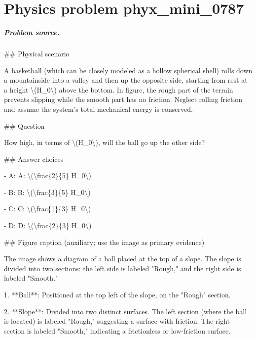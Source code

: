 
\chapter{Physics problem phyx\_mini\_0787}
\label{ch:PhyXMiniProblems_problem_phyx_mini_0787}

\paragraph{Problem source.}
\#\# Physical scenario

A basketball (which can be closely modeled as a hollow spherical shell) rolls down a mountainside into a valley and then up the opposite side, starting from rest at a height \textbackslash{}(H\_0\textbackslash{}) above the bottom. In figure, the rough part of the terrain prevents slipping while the smooth part has no friction. Neglect rolling friction and assume the system’s total mechanical energy is conserved.

\#\# Question

How high, in terms of \textbackslash{}(H\_0\textbackslash{}), will the ball go up the other side?

\#\# Answer choices

- A: A: \textbackslash{}(\textbackslash{}frac\{2\}\{5\} H\_0\textbackslash{})

- B: B: \textbackslash{}(\textbackslash{}frac\{3\}\{5\} H\_0\textbackslash{})

- C: C: \textbackslash{}(\textbackslash{}frac\{1\}\{3\} H\_0\textbackslash{})

- D: D: \textbackslash{}(\textbackslash{}frac\{2\}\{3\} H\_0\textbackslash{})

\#\# Figure caption (auxiliary; use the image as primary evidence)

The image shows a diagram of a ball placed at the top of a slope. The slope is divided into two sections: the left side is labeled "Rough," and the right side is labeled "Smooth." 

1. **Ball**: Positioned at the top left of the slope, on the "Rough" section.
   
2. **Slope**: Divided into two distinct surfaces. The left section (where the ball is located) is labeled "Rough," suggesting a surface with friction. The right section is labeled "Smooth," indicating a frictionless or low-friction surface.


